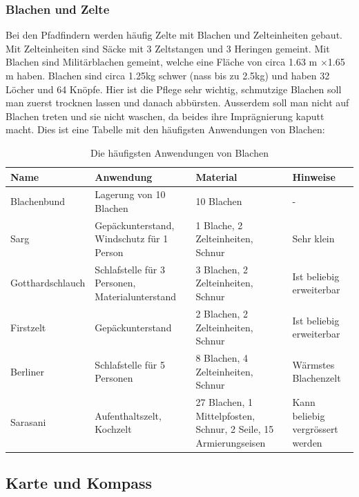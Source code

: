 \subsubsection{Blachen und Zelte}
Bei den Pfadfindern werden häufig Zelte mit Blachen und Zelteinheiten gebaut. Mit Zelteinheiten sind Säcke mit 3 Zeltstangen und 3 Heringen gemeint. Mit Blachen sind Militärblachen gemeint, welche eine Fläche von circa 1.63 m $\times$1.65 m haben. Blachen sind circa 1.25kg schwer (nass bis zu 2.5kg) und haben 32 Löcher und 64 Knöpfe. Hier ist die Pflege sehr wichtig, schmutzige Blachen soll man zuerst trocknen lassen und danach abbürsten. Ausserdem soll man nicht auf Blachen treten und sie nicht waschen, da beides ihre Imprägnierung kaputt macht. \newpage Dies ist eine Tabelle mit den häufigsten Anwendungen von Blachen:

\begin{center}
\begin{table}
\begin{tabularx}{\textwidth}{X|X|X|X}
    \textbf{Name} & \textbf{Anwendung} & \textbf{Material} & \textbf{Hinweise} \\\hline
    Blachenbund & Lagerung von 10 Blachen & 10 Blachen & - \\\hline
    Sarg & Gepäckunterstand, Windschutz für 1 Person & 1 Blache, 2 Zelteinheiten, Schnur & Sehr klein \\\hline
    Gotthardschlauch & Schlafstelle für 3 Personen, Materialunterstand & 3 Blachen, 2 Zelteinheiten, Schnur & Ist beliebig erweiterbar \\\hline
    Firstzelt & Gepäckunterstand & 2 Blachen, 2 Zelteinheiten, Schnur & Ist beliebig erweiterbar \\\hline
    Berliner & Schlafstelle für 5 Personen & 8 Blachen, 4 Zelteinheiten, Schnur & Wärmstes Blachenzelt \\\hline
    Sarasani & Aufenthaltszelt, Kochzelt & 27 Blachen, 1 Mittelpfosten, Schnur, 2 Seile, 15 Armierungseisen & Kann beliebig vergrössert werden \\ 
\end{tabularx}
\caption{Die häufigsten Anwendungen von Blachen}
\end{table}
\end{center}

\subsection*{Karte und Kompass}
